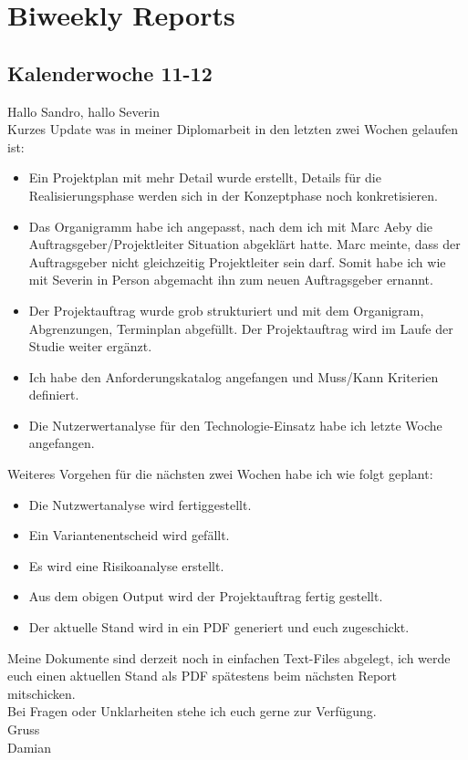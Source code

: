 \chapter{Biweekly Reports}\label{biweeklyreports}

\section{Kalenderwoche 11-12}

Hallo Sandro, hallo Severin\\

\noindent
Kurzes Update was in meiner Diplomarbeit in den letzten zwei Wochen
gelaufen ist:

\begin{itemize}
  \item{}
    Ein Projektplan mit mehr Detail wurde erstellt, Details
    für die Realisierungsphase werden sich in der Konzeptphase
    noch konkretisieren.

  \item{}
    Das Organigramm habe ich angepasst, nach dem ich mit Marc
    Aeby die Auftragsgeber/Projektleiter Situation abgeklärt
    hatte.
    Marc meinte, dass der Auftragsgeber nicht gleichzeitig
    Projektleiter sein darf. Somit habe ich wie mit Severin
    in Person abgemacht ihn zum neuen Auftragsgeber ernannt.

  \item{}
    Der Projektauftrag wurde grob strukturiert und mit dem
    Organigram, Abgrenzungen, Terminplan abgefüllt.
    Der Projektauftrag wird im Laufe der Studie weiter ergänzt.

  \item{}
    Ich habe den Anforderungskatalog angefangen und Muss/Kann
    Kriterien definiert.

  \item{}
    Die Nutzerwertanalyse für den Technologie-Einsatz habe ich
    letzte Woche angefangen.
\end{itemize}

\noindent
Weiteres Vorgehen für die nächsten zwei Wochen habe ich wie folgt geplant:

\begin{itemize}
  \tightlist{}
  \item{} Die Nutzwertanalyse wird fertiggestellt.
  \item{} Ein Variantenentscheid wird gefällt.
  \item{} Es wird eine Risikoanalyse erstellt.
  \item{} Aus dem obigen Output wird der Projektauftrag fertig gestellt.
  \item{} Der aktuelle Stand wird in ein PDF generiert und euch zugeschickt.
\end{itemize}

\noindent
Meine Dokumente sind derzeit noch in einfachen Text-Files abgelegt, ich
werde euch einen aktuellen Stand als PDF spätestens beim nächsten Report
mitschicken.\\

\noindent
Bei Fragen oder Unklarheiten stehe ich euch gerne zur Verfügung.\\

\noindent
Gruss\\
Damian
